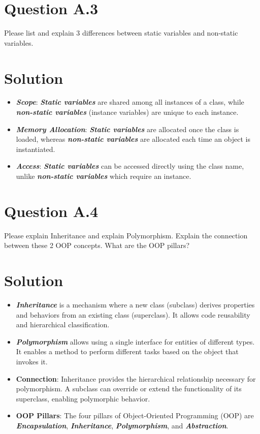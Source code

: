 \documentclass[12pt]{article}
\begin{document}
\section*{Question A.3}
Please list and explain 3 differences between static variables and non-static variables.

\section*{Solution}
\begin{itemize}
  \item \textbf{\textit{Scope}}: \textbf{\textit{Static variables}} are shared among all instances of a class, while \textbf{\textit{non-static variables}} (instance variables) are unique to each instance.
  \item \textbf{\textit{Memory Allocation}}: \textbf{\textit{Static variables}} are allocated once the class is loaded, whereas \textbf{\textit{non-static variables}} are allocated each time an object is instantiated.
  \item \textbf{\textit{Access}}: \textbf{\textit{Static variables}} can be accessed directly using the class name, unlike \textbf{\textit{non-static variables}} which require an instance.
\end{itemize}


\section*{Question A.4}
Please explain Inheritance and explain Polymorphism. Explain the connection between these 2 OOP concepts. What are the OOP pillars?

\section*{Solution}
\begin{itemize}
  \item \textbf{\textit{Inheritance}} is a mechanism where a new class (subclass) derives properties and behaviors from an existing class (superclass). It allows code reusability and hierarchical classification.
  \item \textbf{\textit{Polymorphism}} allows using a single interface for entities of different types. It enables a method to perform different tasks based on the object that invokes it.
  \item \textbf{Connection}: Inheritance provides the hierarchical relationship necessary for polymorphism. A subclass can override or extend the functionality of its superclass, enabling polymorphic behavior.
  \item \textbf{OOP Pillars}: The four pillars of Object-Oriented Programming (OOP) are \textbf{\textit{Encapsulation}}, \textbf{\textit{Inheritance}}, \textbf{\textit{Polymorphism}}, and \textbf{\textit{Abstraction}}.
\end{itemize}
\end{document}
